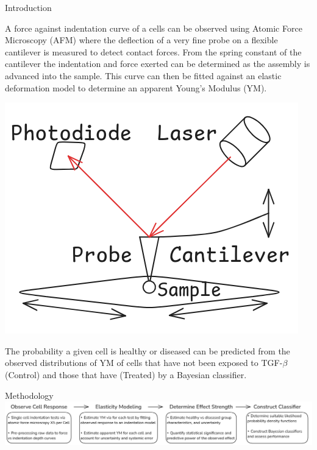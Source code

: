 \documentclass[a0paper,portrait]{baposter}
\begin{document}
\begin{poster}
\begin{posterbox}[name=intro,span=2,column=1,row=0]{Introduction}
\begin{minipage}[t]{0.775\linewidth}
  \vspace{0pt}
  A force against indentation curve of a cells can be observed using Atomic Force Microscopy (AFM) where the deflection of a very fine probe on a flexible cantilever is measured to detect contact forces. 
  From the spring constant of the cantilever the indentation and force exerted can be determined as the assembly is advanced into the sample. 
  This curve can then be fitted against an elastic deformation model to determine an apparent Young's Modulus (YM). 
\end{minipage}
\hfill
\begin{minipage}[t]{0.2\linewidth}
  \vspace{-10pt}
  \centering
  \includegraphics[width=\linewidth]{images/Atomic Force Microscopy - mechanism diagram.png}
\end{minipage}
\vspace{1em}

The probability a given cell is healthy or diseased can be predicted from the observed distributions of YM of cells that have not been exposed to TGF-$\beta$ (Control) and those that have (Treated) by a Bayesian classifier.

\end{posterbox}


\begin{posterbox}[name=method,span=2,column=1,below=intro]{Methodology}
\includegraphics[width=\linewidth]{images/Methodology Summary Blocks.png}


\end{posterbox}
\end{poster}
\end{document}
